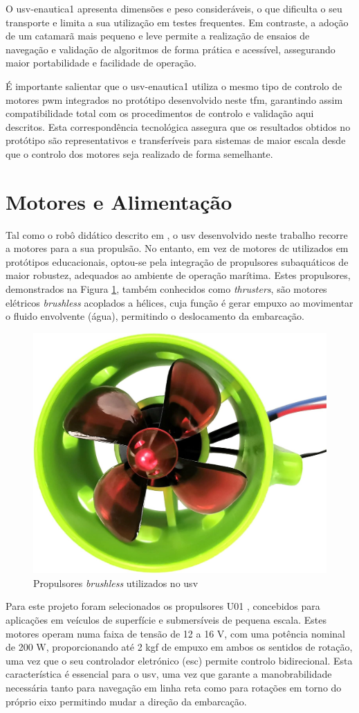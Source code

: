 O \gls{usv}-enautica1 apresenta dimensões e peso consideráveis, o que dificulta o seu transporte e limita a sua utilização em testes frequentes. Em contraste, a adoção de um catamarã mais pequeno e leve permite a realização de ensaios de navegação e validação de algoritmos de forma prática e acessível, assegurando maior portabilidade e facilidade de operação.  

É importante salientar que o \gls{usv}-enautica1 utiliza o mesmo tipo de controlo de motores \gls{pwm} integrados no protótipo desenvolvido neste \gls{tfm}, garantindo assim compatibilidade total com os procedimentos de controlo e validação aqui descritos. Esta correspondência tecnológica assegura que os resultados obtidos no protótipo são representativos e transferíveis para sistemas de maior escala desde que o controlo dos motores seja realizado de forma semelhante.

\section{Motores e Alimentação}
\label{sec:motor}

Tal como o robô didático descrito em \cite{didactic-robot-thesis}, o \gls{usv} desenvolvido neste trabalho recorre a motores para a sua propulsão. No entanto, em vez de motores \gls{dc} utilizados em protótipos educacionais, optou-se pela integração de propulsores subaquáticos de maior robustez, adequados ao ambiente de operação marítima. Estes propulsores, demonstrados na Figura \ref{fig:thrusters}, também conhecidos como \emph{thrusters}, são motores elétricos \emph{brushless} acoplados a hélices, cuja função é gerar empuxo ao movimentar o fluido envolvente (água), permitindo o deslocamento da embarcação.

\begin{figure}[H]
    \centering
    \includegraphics[width=0.33\linewidth]{figuras/thrusters.jpg}
    \caption{Propulsores \emph{brushless} utilizados no \gls{usv}}
    \label{fig:thrusters}
\end{figure}

Para este projeto foram selecionados os propulsores U01 \cite{apisqueen-underwater-thruster}, concebidos para aplicações em veículos de superfície e submersíveis de pequena escala. Estes motores operam numa faixa de tensão de 12 a 16 V, com uma potência nominal de 200 W, proporcionando até 2 kgf de empuxo em ambos os sentidos de rotação, uma vez que o seu controlador eletrónico (\gls{esc}) permite controlo bidirecional. Esta característica é essencial para o \gls{usv}, uma vez que garante a manobrabilidade necessária tanto para navegação em linha reta como para rotações em torno do próprio eixo permitindo mudar a direção da embarcação.

